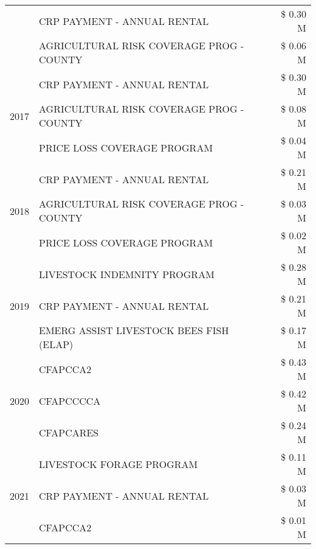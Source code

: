 \begin{tabular}{llr}
 & CRP PAYMENT - ANNUAL RENTAL & \$ 0.30 M \\
 & AGRICULTURAL RISK COVERAGE PROG - COUNTY & \$ 0.06 M \\
\cline{1-3}
\multirow[t]{3}{*}{2017} & CRP PAYMENT - ANNUAL RENTAL & \$ 0.30 M \\
 & AGRICULTURAL RISK COVERAGE PROG - COUNTY & \$ 0.08 M \\
 & PRICE LOSS COVERAGE PROGRAM & \$ 0.04 M \\
\cline{1-3}
\multirow[t]{3}{*}{2018} & CRP PAYMENT - ANNUAL RENTAL & \$ 0.21 M \\
 & AGRICULTURAL RISK COVERAGE PROG - COUNTY & \$ 0.03 M \\
 & PRICE LOSS COVERAGE PROGRAM & \$ 0.02 M \\
\cline{1-3}
\multirow[t]{3}{*}{2019} & LIVESTOCK INDEMNITY PROGRAM & \$ 0.28 M \\
 & CRP PAYMENT - ANNUAL RENTAL & \$ 0.21 M \\
 & EMERG ASSIST LIVESTOCK BEES FISH (ELAP) & \$ 0.17 M \\
\cline{1-3}
\multirow[t]{3}{*}{2020} & CFAPCCA2 & \$ 0.43 M \\
 & CFAPCCCCA & \$ 0.42 M \\
 & CFAPCARES & \$ 0.24 M \\
\cline{1-3}
\multirow[t]{3}{*}{2021} & LIVESTOCK FORAGE PROGRAM & \$ 0.11 M \\
 & CRP PAYMENT - ANNUAL RENTAL & \$ 0.03 M \\
 & CFAPCCA2 & \$ 0.01 M \\
\cline{1-3}
\bottomrule
\end{tabular}
